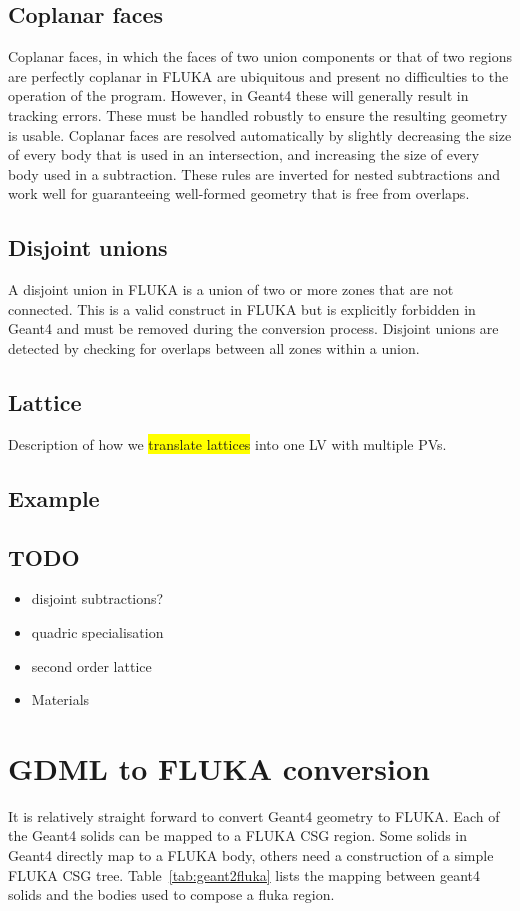 \documentclass[final,5p,times,twocolumn]{elsarticle}
\begin{document}
\subsection{Coplanar faces}

Coplanar faces, in which the faces of two union components or that of
two regions are perfectly coplanar in FLUKA are ubiquitous and present
no difficulties to the operation of the program.  However, in Geant4
these will generally result in tracking errors.  These must be handled
robustly to ensure the resulting geometry is usable.  Coplanar faces
are resolved automatically by slightly decreasing the size of every
body that is used in an intersection, and increasing the size of every
body used in a subtraction.  These rules are inverted for nested
subtractions and work well for guaranteeing well-formed geometry that
is free from overlaps.


\subsection{Disjoint unions}
A disjoint union in FLUKA is a union of two or more zones that are not
connected.  This is a valid construct in FLUKA but is explicitly
forbidden in Geant4 and must be removed during the conversion
process.  Disjoint unions are detected by checking for overlaps
between all zones within a union.

\subsection{Lattice}
Description of how we \colorbox{yellow}{translate lattices} 
into one LV with multiple PVs.

\subsection{Example}

\subsection{TODO}
\begin{itemize}
\item disjoint subtractions?
\item quadric specialisation
\item second order lattice
\item Materials 
\end{itemize}
\section{GDML to FLUKA conversion}
It is relatively straight forward to convert Geant4 geometry to FLUKA. Each of the Geant4 solids can be mapped to a FLUKA CSG region.
Some solids in Geant4 directly map to a FLUKA body, others need a construction of a simple FLUKA CSG tree. Table~\ref{tab:geant2fluka}
lists the mapping between geant4 solids and the bodies used to compose a fluka region.
\end{document}
